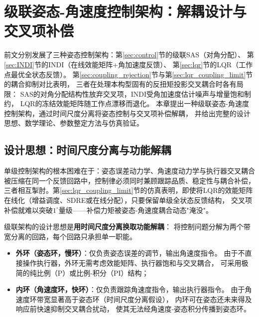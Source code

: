 
\section{级联姿态-角速度控制架构：解耦设计与交叉项补偿}
\label{sec:cascade_chapter}

前文分别发展了三种姿态控制架构：第\ref{sec:control}节的级联SAS（对角分配）、
第\ref{sec:INDI}节的INDI（在线效能矩阵+角加速度反馈）、
第\ref{sec:lqr}节的LQR（工作点最优全状态反馈）。
第\ref{sec:coupling_rejection}节与第\ref{sec:lqr_coupling_limit}节的耦合抑制对比表明，
三者在处理本构型固有的反扭矩投影交叉耦合时各有局限：
SAS的对角分配结构性放弃交叉项，INDI受角加速度估计噪声与增量饱和制约，
LQR的冻结效能矩阵随工作点漂移而退化。
本章提出一种级联姿态-角速度控制架构，通过时间尺度分离将姿态控制与交叉项补偿解耦，
并给出完整的设计思想、数学理论、参数整定方法与仿真验证。

\subsection{设计思想：时间尺度分离与功能解耦}
\label{sec:cascade_philosophy}

单级控制架构的根本困难在于：姿态误差动力学、角速度动力学与执行器交叉耦合
被压缩在同一个反馈回路中，控制律必须同时兼顾跟踪品质、稳定性与耦合补偿，
三者相互掣肘。第\ref{sec:lqr_coupling_limit}节的仿真表明，即使将LQR的效能矩阵
在线化（增益调度、SDRE或在线分配），只要保留单级全状态反馈结构，
交叉项补偿就难以突破$1^\circ$量级——补偿力矩被姿态-角速度耦合动态"淹没"。

级联架构的设计思想是\textbf{用时间尺度分离换取功能解耦}：
将控制问题分解为两个带宽分离的回路，每个回路只承担单一职能。

\begin{itemize}
    \item \textbf{外环（姿态环，慢环）}：仅负责姿态误差的调节，输出角速度指令。
          由于不直接操作执行器，外环无需考虑效能矩阵、执行器饱和与交叉耦合，
          可采用极简的纯比例（P）或比例-积分（PI）结构；
    \item \textbf{内环（角速度环，快环）}：仅负责跟踪角速度指令，输出执行器指令。
          由于角速度环带宽显著高于姿态环（时间尺度分离假设），
          内环可在姿态还未来得及响应前快速抑制交叉耦合扰动，
          使其无法经角速度-姿态积分传播到姿态环。
\end{itemize}

